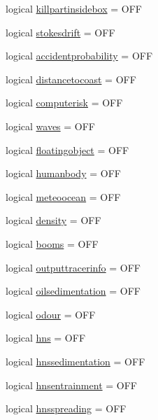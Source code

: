 \begin{DoxyCompactItemize}
logical \mbox{\hyperlink{structmodulelagrangianglobal_1_1t__state_a3275e49a21bb485ca35aad002a089e64}{killpartinsidebox}} = O\+FF
\item 
logical \mbox{\hyperlink{structmodulelagrangianglobal_1_1t__state_a42be647bbc1bbd85912b96d6fa392733}{stokesdrift}} = O\+FF
\item 
logical \mbox{\hyperlink{structmodulelagrangianglobal_1_1t__state_a38d9598af8b33442766bdc7955d9f596}{accidentprobability}} = O\+FF
\item 
logical \mbox{\hyperlink{structmodulelagrangianglobal_1_1t__state_a1a2a5cba164dcb792200f4646c0abd97}{distancetocoast}} = O\+FF
\item 
logical \mbox{\hyperlink{structmodulelagrangianglobal_1_1t__state_a7504acd9a7e91ed4cbbca04030085209}{computerisk}} = O\+FF
\item 
logical \mbox{\hyperlink{structmodulelagrangianglobal_1_1t__state_a533f9acae2e8fc69d1e0fdaeb647e761}{waves}} = O\+FF
\item 
logical \mbox{\hyperlink{structmodulelagrangianglobal_1_1t__state_a14ee5eafa95326e0ce328b0951c074f6}{floatingobject}} = O\+FF
\item 
logical \mbox{\hyperlink{structmodulelagrangianglobal_1_1t__state_a9ed7a91efd2bf4b8bfe143027ef95ace}{humanbody}} = O\+FF
\item 
logical \mbox{\hyperlink{structmodulelagrangianglobal_1_1t__state_a7f0b05d8b665eb9f8c0b33123e257c92}{meteoocean}} = O\+FF
\item 
logical \mbox{\hyperlink{structmodulelagrangianglobal_1_1t__state_a125cc2c74f62e83fc4be4fe072a99284}{density}} = O\+FF
\item 
logical \mbox{\hyperlink{structmodulelagrangianglobal_1_1t__state_a0b2a34d603331604810a4ed4ec74eac4}{booms}} = O\+FF
\item 
logical \mbox{\hyperlink{structmodulelagrangianglobal_1_1t__state_a88b42d6f0c2e9a22668a789a1ee17ac0}{outputtracerinfo}} = O\+FF
\item 
logical \mbox{\hyperlink{structmodulelagrangianglobal_1_1t__state_adc2573963fda8ecafb654c1b62aa8dee}{oilsedimentation}} = O\+FF
\item 
logical \mbox{\hyperlink{structmodulelagrangianglobal_1_1t__state_ac1f464113ce7e7194b408ac883b30ee9}{odour}} = O\+FF
\item 
logical \mbox{\hyperlink{structmodulelagrangianglobal_1_1t__state_af9e8b41cdd865ee03c924c093dc6d9d4}{hns}} = O\+FF
\item 
logical \mbox{\hyperlink{structmodulelagrangianglobal_1_1t__state_ad04002dc2cdba97545f4b9ad3fbd4262}{hnssedimentation}} = O\+FF
\item 
logical \mbox{\hyperlink{structmodulelagrangianglobal_1_1t__state_a4eb30ff75d13ca641af8e8f6cc8b213a}{hnsentrainment}} = O\+FF
\item 
logical \mbox{\hyperlink{structmodulelagrangianglobal_1_1t__state_af08a16f9bd75808170e6d6883b3f7036}{hnsspreading}} = O\+FF
\end{DoxyCompactItemize}


